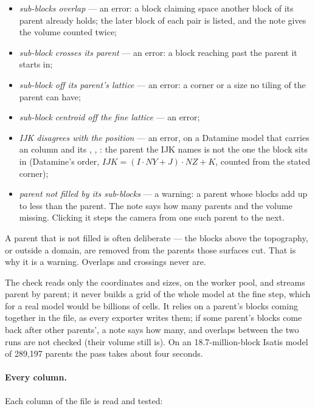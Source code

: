 \begin{itemize}
\item \emph{sub-blocks overlap} — an error: a block claiming space another block of its parent already holds; the later block of each pair is listed, and the note gives the volume counted twice;
\item \emph{sub-block crosses its parent} — an error: a block reaching past the parent it starts in;
\item \emph{sub-block off its parent's lattice} — an error: a corner or a size no tiling of the parent can have;
\item \emph{sub-block centroid off the fine lattice} — an error;
\item \emph{IJK disagrees with the position} — an error, on a Datamine model that carries an  column and its , , : the parent the IJK names is not the one the block sits in (Datamine's order, \(\mathit{IJK} = (I \cdot \mathit{NY} + J) \cdot \mathit{NZ} + K\), counted from the stated corner);
\item \emph{parent not filled by its sub-blocks} — a warning: a parent whose blocks add up to less than the parent. The note says how many parents and the volume missing. Clicking it steps the camera from one such parent to the next.
\end{itemize}

A parent that is not filled is often deliberate — the blocks above the topography, or outside a domain, are removed from the parents those surfaces cut. That is why it is a warning. Overlaps and crossings never are.

The check reads only the coordinates and sizes, on the worker pool, and streams parent by parent; it never builds a grid of the whole model at the fine step, which for a real model would be billions of cells. It relies on a parent's blocks coming together in the file, as every exporter writes them; if some parent's blocks come back after other parents', a note says how many, and overlaps between the two runs are not checked (their volume still is). On an 18.7-million-block Isatis model of 289,197 parents the pass takes about four seconds.

\paragraph{Every column.} Each column of the file is read and tested:

